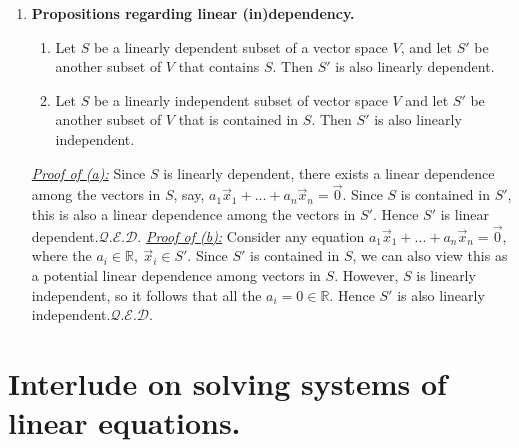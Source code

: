 \documentclass[12pt]{book}
\newcommand{\settag}[1]{\renewcommand{\theenumi}{#1}}
\newcommand{\R}{\mathbb{R}}
\newcommand{\qed}{\hfill $\mathcal{Q}.\mathcal{E}.\mathcal{D}.$}
\begin{document}
\begin{enumerate}
        \settag{1.4.7}
        \item \textbf{Propositions regarding linear (in)dependency.}
            \begin{enumerate}
                \item Let $S$ be a linearly dependent subset of a vector space $V$, and let $S'$ be another subset of $V$ that contains $S$. Then $S'$ is also linearly dependent.
                \item Let $S$ be a linearly independent subset of vector space $V$ and let $S'$ be another subset of $V$ that is contained in $S$. Then $S'$ is also linearly independent.
            \end{enumerate}
        \underline{\textit{Proof of (a):}}
        Since $S$ is linearly dependent, there exists a linear dependence among the vectors in $S$, say, $a_1\vec{x}_1 + ...+ a_n\vec{x}_n = \vec{0}$. Since $S$ is contained in $S'$, this is also a linear dependence among the vectors in $S'$. Hence $S'$ is linear dependent.\qed\newline
        \underline{\textit{Proof of (b):}}
        Consider any equation $a_1\vec{x}_1 + ...+ a_n\vec{x}_n = \vec{0}$, where the $a_i \in \R,~\vec{x}_i \in S'$. Since $S'$ is contained in $S$, we can also view this as a potential linear dependence among vectors in $S$. However, $S$ is linearly independent, so it follows that all the $a_i = 0\in \R$. Hence $S'$ is also linearly independent.\qed
    \end{enumerate}
    
\section{Interlude on solving systems of linear equations.} 
    
\end{document}
